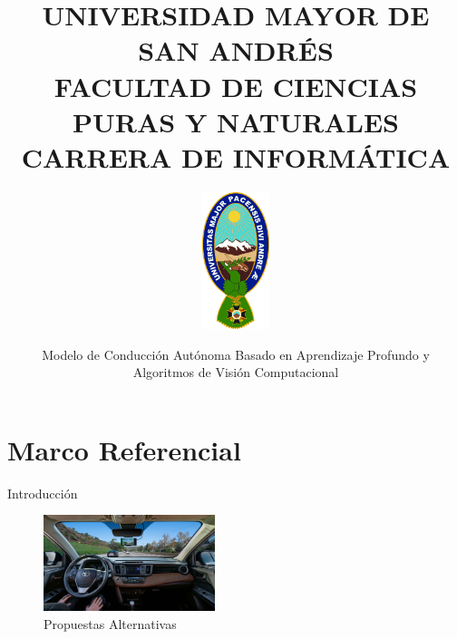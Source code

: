 \documentclass[10pt, usepdftitle=false]{beamer}
\title{UNIVERSIDAD MAYOR DE SAN ANDRÉS\\\vspace{1mm}\normalsize FACULTAD DE CIENCIAS PURAS Y NATURALES\\\vspace{-2mm} CARRERA DE INFORMÁTICA}
\subtitle{\includegraphics[height=4cm]{imagenes/logo-umsa}}
\date{}
\author{Modelo de Conducción Autónoma Basado en Aprendizaje Profundo y \\Algoritmos de Visión Computacional}
\institute{Rafael Villca Poggian}
\newcommand{\themename}{\textbf{\textsc{metropolis}}\xspace}
\begin{document}
\begin{frame}
	\titlepage
\end{frame}


\section[MARCO REFERENCIAL]{Marco Referencial}

\begin{frame}[fragile]{Introducción}

%
%
%


\begin{figure}[H]
	\captionsetup[subfloat]{labelformat=empty}
	\centering
\end{figure}

\begin{figure}[H]
	\captionsetup{labelformat=empty}
	\centering
	\includegraphics[width=5cm]{imagenes/comma}
	\caption{Propuestas Alternativas}
\end{figure}

\end{frame}
\end{document}
